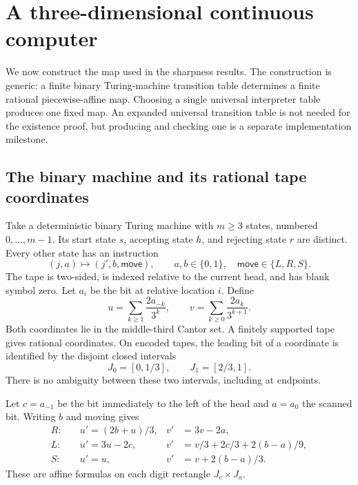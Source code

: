 \documentclass[11pt,letterpaper]{article}
\numberwithin{equation}{section}
\theoremstyle{definition}
\theoremstyle{remark}
\newcommand{\PWA}{piecewise-affine}
\begin{document}
\section{A three-dimensional continuous computer}
\label{pqc:cb:sec:construction}

We now construct the map used in the sharpness results.  The construction is
generic: a finite binary Turing-machine transition table determines a finite
rational \PWA{} map.  Choosing a single universal interpreter table produces
one fixed map.  An expanded universal transition table is not needed for the
existence proof, but producing and checking one is a separate implementation
milestone.

\subsection{The binary machine and its rational tape coordinates}

Take a deterministic binary Turing machine with $m\ge3$ states, numbered
$0,\ldots,m-1$.  Its start state $s$, accepting state $h$, and rejecting state
$r$ are distinct.  Every other state has an instruction
\[
 (j,a)\longmapsto (j',b,\mathsf{move}),\qquad
 a,b\in\{0,1\},\quad\mathsf{move}\in\{L,R,S\}.
\]
The tape is two-sided, is indexed relative to the current head, and has blank
symbol zero.  Let $a_i$ be the bit at relative location $i$.  Define
\begin{equation}
 u=\sum_{k\ge1}\frac{2a_{-k}}{3^k},\qquad
 v=\sum_{k\ge0}\frac{2a_k}{3^{k+1}}.
 \label{pqc:cb:eq:tapes}
\end{equation}
Both coordinates lie in the middle-third Cantor set.  A finitely supported
tape gives rational coordinates.  On encoded tapes, the leading bit of a
coordinate is identified by the disjoint closed intervals
\[
 J_0=[0,1/3],\qquad J_1=[2/3,1].
\]
There is no ambiguity between these two intervals, including at endpoints.

Let $c=a_{-1}$ be the bit immediately to the left of the head and $a=a_0$ the
scanned bit.  Writing $b$ and moving gives
\begin{align}
 R:\quad& u'=(2b+u)/3,&v'&=3v-2a,\label{pqc:cb:eq:right}\\
 L:\quad& u'=3u-2c,&v'&=v/3+2c/3+2(b-a)/9,\label{pqc:cb:eq:left}\\
 S:\quad& u'=u,&v'&=v+2(b-a)/3.\label{pqc:cb:eq:stay}
\end{align}
These are affine formulas on each digit rectangle $J_c\times J_a$.
\end{document}
